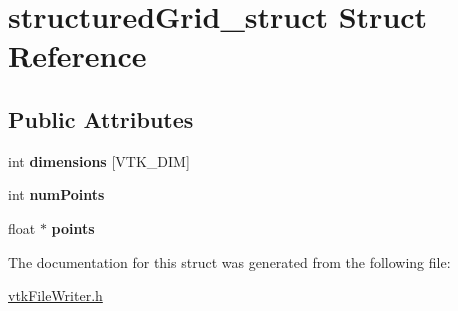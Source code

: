 \hypertarget{structstructuredGrid__struct}{
\section{structuredGrid\_\-struct Struct Reference}
\label{structstructuredGrid__struct}
}
\subsection*{Public Attributes}
\begin{DoxyCompactItemize}
\item 
\hypertarget{structstructuredGrid__struct_a5bba6ca6b74f5ca0bf7e70046201ee1d}{
int {\bfseries dimensions} \mbox{[}VTK\_\-DIM\mbox{]}}
\label{structstructuredGrid__struct_a5bba6ca6b74f5ca0bf7e70046201ee1d}

\item 
\hypertarget{structstructuredGrid__struct_ad6f378dc53f2e0e373051f6e577ad188}{
int {\bfseries numPoints}}
\label{structstructuredGrid__struct_ad6f378dc53f2e0e373051f6e577ad188}

\item 
\hypertarget{structstructuredGrid__struct_aa29d8050d4e205e19b7876d76b3e57da}{
float $\ast$ {\bfseries points}}
\label{structstructuredGrid__struct_aa29d8050d4e205e19b7876d76b3e57da}

\end{DoxyCompactItemize}


The documentation for this struct was generated from the following file:\begin{DoxyCompactItemize}
\item 
\hyperlink{vtkFileWriter_8h}{vtkFileWriter.h}\end{DoxyCompactItemize}

